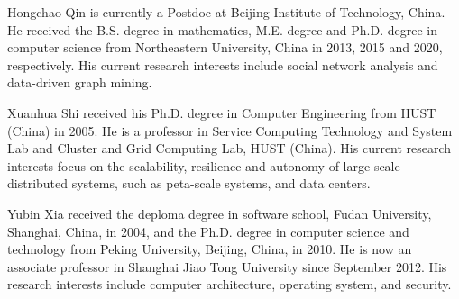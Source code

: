 \documentclass[10pt,journal,compsoc]{IEEEtran}
\begin{document}
\vspace{-10ex}
\begin{IEEEbiography}{Hongchao Qin}
is currently a Postdoc at Beijing Institute of Technology, China. He received the B.S. degree in mathematics, M.E. degree and Ph.D. degree in computer science from Northeastern University, China in 2013, 2015 and 2020, respectively. His current research interests include social network analysis and data-driven graph mining.
\end{IEEEbiography}
\vspace{-10ex}
\begin{IEEEbiography}{Xuanhua Shi}
received his Ph.D. degree in Computer Engineering from HUST (China) in 2005. He is a professor in Service Computing Technology and System Lab and Cluster and Grid
Computing Lab, HUST (China). His current research interests focus on the scalability, resilience and autonomy of large-scale distributed systems, such as peta-scale systems, and data centers.
\end{IEEEbiography}
\vspace{-10ex}
\begin{IEEEbiography}{Yubin Xia}
received the deploma degree in software school, Fudan University, Shanghai, China, in 2004, and the Ph.D. degree in computer science and technology from Peking University, Beijing, China, in 2010. He is now an associate professor in Shanghai Jiao Tong University since September 2012. His research interests include computer architecture, operating system, and security.
\end{IEEEbiography}
\vspace{-10ex}
\end{document}
